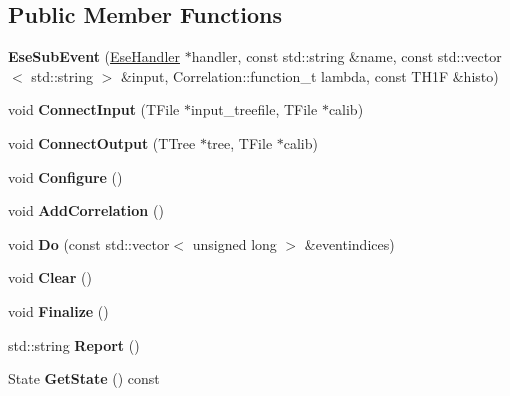 \subsection*{Public Member Functions}
\begin{DoxyCompactItemize}
\item 
\mbox{\label{classQn_1_1EseSubEvent_ac89c06299684f76e6b8110074a42d553}} 
{\bfseries Ese\+Sub\+Event} (\mbox{\hyperlink{classQn_1_1EseHandler}{Ese\+Handler}} $\ast$handler, const std\+::string \&name, const std\+::vector$<$ std\+::string $>$ \&input, Correlation\+::function\+\_\+t lambda, const T\+H1F \&histo)
\item 
\mbox{\label{classQn_1_1EseSubEvent_a8243c90d1d7aa2fc6e0308cb18bf4569}} 
void {\bfseries Connect\+Input} (T\+File $\ast$input\+\_\+treefile, T\+File $\ast$calib)
\item 
\mbox{\label{classQn_1_1EseSubEvent_aaac0a65949ae1c1dfdf29d7e4987267f}} 
void {\bfseries Connect\+Output} (T\+Tree $\ast$tree, T\+File $\ast$calib)
\item 
\mbox{\label{classQn_1_1EseSubEvent_a6bc3388985fc0715ba32e378d428834c}} 
void {\bfseries Configure} ()
\item 
\mbox{\label{classQn_1_1EseSubEvent_adb6e9050cf7cfa775ad07affb94b4ab8}} 
void {\bfseries Add\+Correlation} ()
\item 
\mbox{\label{classQn_1_1EseSubEvent_ab67dbd34169aeb9880ae68819bc21bb2}} 
void {\bfseries Do} (const std\+::vector$<$ unsigned long $>$ \&eventindices)
\item 
\mbox{\label{classQn_1_1EseSubEvent_a0748197895abc2934bd441642983c750}} 
void {\bfseries Clear} ()
\item 
\mbox{\label{classQn_1_1EseSubEvent_a2fc8b53006e70b3afb4669a5a98a5c5a}} 
void {\bfseries Finalize} ()
\item 
\mbox{\label{classQn_1_1EseSubEvent_a0b3b24e583618bebf4d364edcfc8cc55}} 
std\+::string {\bfseries Report} ()
\item 
\mbox{\label{classQn_1_1EseSubEvent_a810c864e00edeeaad1b3c8abc6a86092}} 
State {\bfseries Get\+State} () const
\end{DoxyCompactItemize}
